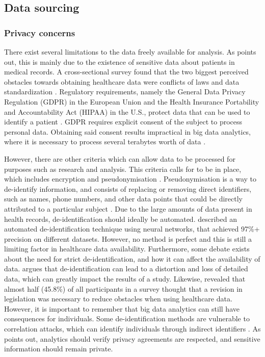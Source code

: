 \documentclass[a4paper,12pt]{article}
\begin{document}
\subsection{Data sourcing}

\subsubsection{Privacy concerns}

There exist several limitations to the data freely available for analysis.
As \textcite[2]{Dalianis2015} points out, this is mainly due to the existence of sensitive data about patients in medical records.
A cross-sectional survey found that the two biggest perceived obstacles towards obtaining healthcare data were conflicts of laws and data standardization \parencite{Kim2019}.
Regulatory requirements, namely the General Data Privacy Regulation (GDPR) in the European Union and the Health Insurance Portability and Accountability Act (HIPAA) in the U.S., protect data that can be used to identify a patient \parencite{Iyengar2018}.
GDPR requires explicit consent of the subject to process personal data. Obtaining said consent results impractical in big data analytics, where it is necessary to process several terabytes worth of data \parencite{Hintze2018}.

However, there are other criteria which can allow data to be processed for purposes such as research and analysis.
This criteria calls for  to be in place, which includes encryption and pseudonymisation \parencite[151]{Hintze2018}.
Pseudonymisation is a way to de-identify information, and consists of replacing or removing direct identifiers, such as names, phone numbers, and other data points that could be directly attributed to a particular subject \parencite[146-147]{Hintze2018}.
Due to the large amounts of data present in health records, de-identification should ideally be automated.
\textcite{Dernoncourt2016} described an automated de-identification technique using neural networks, that achieved 97\%+ precision on different datasets.
However, no method is perfect and this is still a limiting factor in healthcare data availability.
Furthermore, some debate exists about the need for strict de-identification, and how it can affect the availability of data.
\textcite[2]{Shin2018} argues that de-identification can lead to a distortion and loss of detailed data, which can greatly impact the results of a study.
Likewise, \textcite{Kim2019} revealed that almost half (45.8\%) of all participants in a survey thought that a revision in legislation was necessary to reduce obstacles when using healthcare data.
However, it is important to remember that big data analytics can still have consequences for individuals.
Some de-identification methods are vulnerable to correlation attacks, which can identify individuals through indirect identifiers \parencite{Abouelmehdi2018}.
As \textcite{Abouelmehdi2018} points out, analytics should verify privacy agreements are respected, and sensitive information should remain private.
\end{document}
